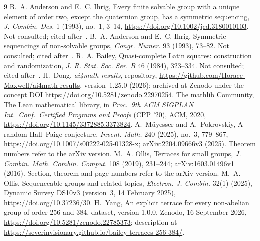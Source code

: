 \documentclass[11pt]{article}
\theoremstyle{definition}
\theoremstyle{remark}
\newcommand{\repoversion}{1.25.0}
\begin{document}
{\small
\begin{thebibliography}{9}
\setlength{\itemsep}{1pt}
 B.~A. Anderson and E.~C. Ihrig, Every finite solvable group
with a unique element of order two, except the quaternion group, has a
symmetric sequencing, \emph{J. Combin. Des.} 1 (1993), no.~1, 3--14,
\url{https://doi.org/10.1002/jcd.3180010103}. Not consulted; cited after~\cite{survey}.
 B.~A. Anderson and E.~C. Ihrig, Symmetric sequencings of
non-solvable groups, \emph{Congr. Numer.} 93 (1993), 73--82. Not consulted;
cited after~\cite{ollis16,survey}.
 R.~A. Bailey, Quasi-complete Latin squares: construction and
randomization, \emph{J. R. Stat. Soc. Ser. B} 46 (1984), 323--334. Not
consulted; cited after~\cite{ollis16,survey}.
 H.~Dong, \emph{ai4math-results}, repository,
\url{https://github.com/Horace-Maxwell/ai4math-results}, version~\repoversion{}
(2026); archived at Zenodo under the concept DOI
\url{https://doi.org/10.5281/zenodo.22970254}.
The mathlib Community, The Lean mathematical library, in \emph{Proc.\ 9th ACM
SIGPLAN Int.\ Conf.\ Certified Programs and Proofs} (CPP '20), ACM, 2020,
\url{https://doi.org/10.1145/3372885.3373824}.
 A.~Müyesser and A.~Pokrovskiy, A random Hall--Paige conjecture,
\emph{Invent. Math.} 240 (2025), no.~3, 779--867,
\url{https://doi.org/10.1007/s00222-025-01328-x}; arXiv:2204.09666v3 (2025).
Theorem numbers refer to the arXiv version.
 M.~A. Ollis, Terraces for small groups, \emph{J. Combin.
Math. Combin. Comput.} 108 (2019), 231--244; arXiv:1603.01496v1 (2016).
Section, theorem and page numbers refer to the arXiv version.
 M.~A. Ollis, Sequenceable groups and related topics,
\emph{Electron. J. Combin.} 32(1) (2025), Dynamic Survey DS10v3 (version~3,
14 February 2025), \url{https://doi.org/10.37236/30}.
 H.~Yang, An explicit terrace for every non-abelian group of
order 256 and 384, dataset, version 1.0.0, Zenodo, 16 September 2026,
\url{https://doi.org/10.5281/zenodo.22785373}; description at
\url{https://severinvisionary.github.io/bailey-terraces-256-384/}.
\end{thebibliography}}
\end{document}
